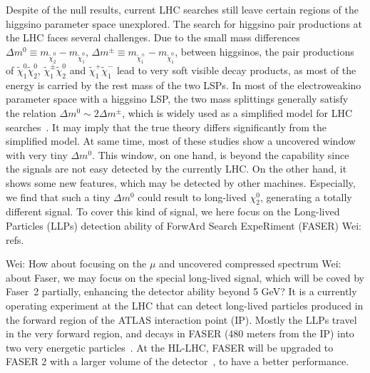 \documentclass[letterpaper,11pt]{article}
\def\to{\rightarrow}
\newcommand{\Wei}[1]{\textcolor{green2} {Wei: #1}}
\begin{document}
Despite of the null results, current LHC searches still leave certain regions of the higgsino parameter space unexplored. The search for higgsino pair productions at the LHC faces several challenges. Due to the small mass differences 
$\Delta m^0 \equiv m_{\tilde{\chi}_2^0} - m_{\tilde{\chi}_1^0}$, 
$\Delta m^\pm \equiv m_{\tilde{\chi}_1^\pm} - m_{\tilde{\chi}_1^0}$, 
between higgsinos, the pair productions of $\tilde{\chi}_1^0 \tilde{\chi}_2^0$, $\tilde{\chi}_1^\pm \tilde{\chi}_2^0$ and $\tilde{\chi}_1^+ \tilde{\chi}_1^-$ lead to very soft visible decay products, as most of the energy is carried by the rest mass of the two LSPs. In most of the electroweakino parameter space with a higgsino LSP, the two mass splittings generally satisfy the relation $\Delta m^0 \sim 2 \Delta m^\pm$, which is widely used as a simplified model for LHC searches~\cite{LHCNewPhysicsWorkingGroup:2011mji, Canepa:2020ntc}. 
% 
It may imply that the true theory differs significantly from the simplified model. At same time, most of these studies show a uncovered window with very tiny $\Delta m^0$. This window, on one hand, is beyond the capability since the signals are not easy detected by the currently LHC. On the other hand, it shows some new features, which may be detected by other machines. Especially, we find that such a tiny $\Delta m^0$ could result to long-lived $\chi^0_2$, generating a totally different signal. To cover this kind of signal, we here focus on the Long-lived Particles (LLPs) detection ability of ForwArd Search ExpeRiment (FASER) \Wei{refs}.

\Wei{How about focusing on the $\mu$ and uncovered compressed spectrum }
\Wei{about Faser, we may focus on the special long-lived signal, which will be coved by Faser~2 partially, enhancing the detector ability beyond 5 GeV?}
% 
It is a currently operating experiment at the LHC that can detect long-lived particles produced in the forward region of the ATLAS interaction point (IP). Mostly the LLPs travel in the very forward region,  and decays in FASER (480 meters from the IP) into two very energetic particles~\cite{Feng:2017uoz,FASER:2018ceo, FASER:2018bac, FASER:2022hcn, FASER:2021ljd,FASER:2021cpr}. At the HL-LHC,  FASER will be upgraded to FASER 2 with a larger volume of the detector~\cite{FASER:2018eoc,Anchordoqui:2021ghd,Feng:2022inv}, to have a better performance. 
%
\end{document}
